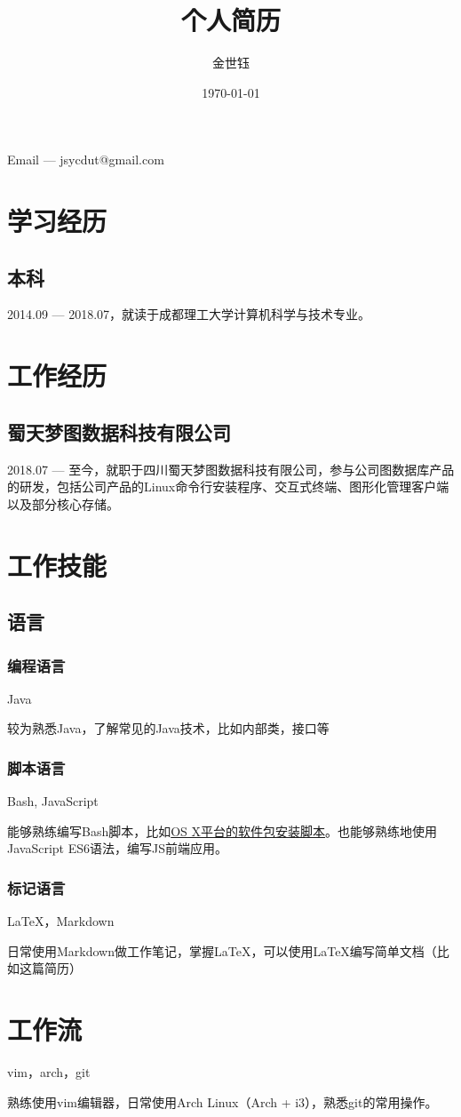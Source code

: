 \documentclass[a4paper]{article}
\makeatletter
\renewcommand{\maketitle}{
\begin{center}
{\huge
\theauthor}

Email --- jsycdut@gmail.com

\vspace{.5em}
\end{center}
}
\makeatother
\begin{document}
\title{个人简历}
\author{金世钰}
\date{\today}
\maketitle

\section{学习经历}
\subsection{本科}
2014.09 --- 2018.07，就读于成都理工大学计算机科学与技术专业。
\section{工作经历}
\subsection{蜀天梦图数据科技有限公司}
2018.07 --- 至今，就职于四川蜀天梦图数据科技有限公司，参与公司图数据库产品的研发，包括公司产品的Linux命令行安装程序、交互式终端、图形化管理客户端以及部分核心存储。

\section{工作技能}

\subsection{语言}
\subsubsection{编程语言}
Java

较为熟悉Java，了解常见的Java技术，比如内部类，接口等

\subsubsection{脚本语言}
Bash, JavaScript

能够熟练编写Bash脚本，比如{\href{https://github.com/jsycdut/mac-setup}{OS X平台的软件包安装脚本}}。也能够熟练地使用JavaScript ES6语法，编写JS前端应用。

\subsubsection{标记语言}
{\LaTeX}，Markdown

日常使用Markdown做工作笔记，掌握{\LaTeX}，可以使用{\LaTeX}编写简单文档（比如这篇简历）

\section{工作流}
vim，arch，git

熟练使用vim编辑器，日常使用Arch Linux（Arch + i3），熟悉git的常用操作。
\end{document}
